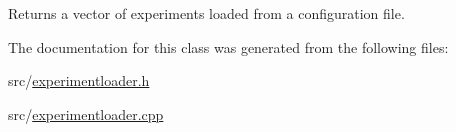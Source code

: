 \begin{DoxyReturn}{Returns}
a vector of experiments loaded from a configuration file. 
\end{DoxyReturn}


The documentation for this class was generated from the following files\+:\begin{DoxyCompactItemize}
\item 
src/\mbox{\hyperlink{experimentloader_8h}{experimentloader.\+h}}\item 
src/\mbox{\hyperlink{experimentloader_8cpp}{experimentloader.\+cpp}}\end{DoxyCompactItemize}
